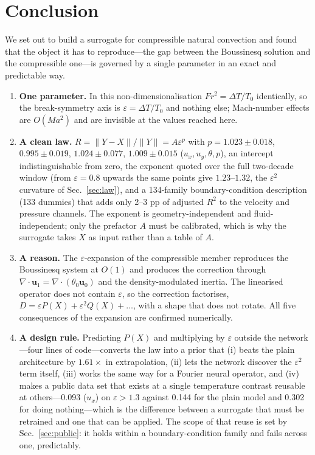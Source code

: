 \documentclass[11pt,a4paper]{article}
\begin{document}
\section{Conclusion}
\label{sec:conclusion}

We set out to build a surrogate for compressible natural convection and found that the object it has
to reproduce---the gap between the Boussinesq solution and the compressible one---is governed by a
single parameter in an exact and predictable way.

\begin{enumerate}
\item \textbf{One parameter.} In this non-dimensionalisation $Fr^2=\Delta T/T_0$ identically, so
the break-symmetry axis is $\varepsilon=\Delta T/T_0$ and nothing else; Mach-number effects are
$O(Ma^2)$ and are invisible at the values reached here.
\item \textbf{A clean law.} $R=\|Y-X\|/\|Y\|=A\varepsilon^p$ with
$p=1.023\pm0.018$, $0.995\pm0.019$, $1.024\pm0.077$, $1.009\pm0.015$ ($u_x,u_y,\theta,p$), an
intercept indistinguishable from zero, the exponent quoted over the full two-decade window (from
$\varepsilon=0.8$ upwards the same points give $1.23$--$1.32$, the $\varepsilon^2$ curvature of
Sec.~\ref{sec:law}), and a 134-family boundary-condition description (133 dummies) that adds only
2--3 pp of adjusted $R^2$ to the velocity and pressure channels. The exponent is
geometry-independent and fluid-independent; only the prefactor $A$ must be calibrated, which is why
the surrogate takes $X$ as input rather than a table of $A$.
\item \textbf{A reason.} The $\varepsilon$-expansion of the compressible member reproduces the
Boussinesq system at $O(1)$ and produces the correction through
$\nabla\cdot\bm u_1=\nabla\cdot(\theta_0\bm u_0)$ and the density-modulated inertia. The linearised
operator does not contain $\varepsilon$, so the correction factorises,
$D=\varepsilon P(X)+\varepsilon^2Q(X)+\dots$, with a shape that does not rotate. All five
consequences of the expansion are confirmed numerically.
\item \textbf{A design rule.} Predicting $P(X)$ and multiplying by $\varepsilon$ outside the
network---four lines of code---converts the law into a prior that (i) beats the plain architecture
by $1.61\times$ in extrapolation, (ii) lets the network discover the $\varepsilon^2$ term itself,
(iii) works the same way for a Fourier neural operator, and (iv) makes a public data set that exists
at a single temperature contrast reusable at others---0.093 ($u_x$) on $\varepsilon>1.3$ against
0.144 for the plain model and 0.302 for doing nothing---which is the difference between a surrogate
that must be retrained and one that can be applied. The scope of that reuse is set by
Sec.~\ref{sec:public}: it holds within a boundary-condition family and fails across one,
predictably.
\end{enumerate}
\end{document}
